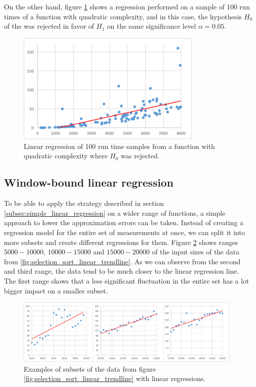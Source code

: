 On the other hand, figure \ref{fig:quadratic_rejected} shows a regression performed on a sample of 100 run times of a function with quadratic complexity, and in this case, the hypothesis $H_0$ of the was rejected in favor of $H_1$ on the same significance level $\alpha = 0.05$.

\begin{figure}[h!]
	\captionsetup{justification=centering,margin=0.5cm}
	\centerline{\mbox{\includegraphics[width=90mm]{./img/quadratic_rejected.png}}}
	\caption{Linear regression of 100 run time samples from a function with quadratic complexity where $H_0$ was rejected.}
	\label{fig:quadratic_rejected}
\end{figure}

\subsection{Window-bound linear regression}
\label{subsec:window_bound_regression}

To be able to apply the strategy described in section \ref{subsec:simple_linear_regression} on a wider range of functions, a simple approach to lower the approximation errors can be taken. Instead of creating a regression model for the entire set of measurements at once, we can split it into more subsets and create different regressions for them. Figure \ref{fig:window_examples} shows ranges $5000 - 10000$, $10000-15000$ and $15000-20000$ of the input sizes of the data from \ref{fig:selection_sort_linear_trendline}. As we can observe from the second and third range, the data tend to be much closer to the linear regression line. The first range shows that a less significant fluctuation in the entire set has a lot bigger impact on a smaller subset.

\begin{figure}[h!]
	\captionsetup{justification=centering,margin=0.5cm}
	\centerline{\mbox{\includegraphics[width=110mm]{./img/window_examples.png}}}
	\caption{Examples of subsets of the data from figure \ref{fig:selection_sort_linear_trendline} with linear regressions.}
	\label{fig:window_examples}
\end{figure}

